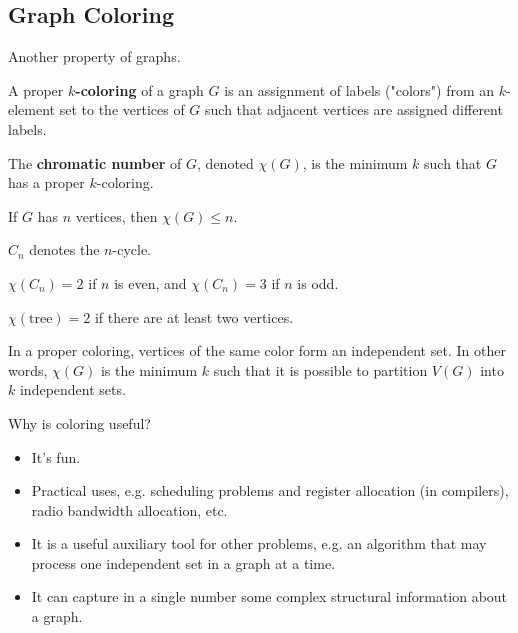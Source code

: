 
\subsection{Graph Coloring}

Another property of graphs.

\begin{definition}
	A proper \( k \)\textbf{-coloring} of a graph \( G \) is an assignment of labels ("colors") from an \( k \)-element set to the vertices of \( G \) such that adjacent vertices are assigned different labels.
\end{definition}

\begin{definition}
	The \textbf{chromatic number} of \( G \), denoted \( \chi(G) \), is the minimum \( k \) such that \( G \) has a proper \( k \)-coloring.
\end{definition}

\begin{note}
	If \( G \) has \( n \) vertices, then \( \chi(G) \le n \).
\end{note}

\begin{notation}
	\( C_n \) denotes the \( n \)-cycle.
\end{notation}

\begin{eg}
	\( \chi(C_n) = 2\) if \( n \) is even, and \( \chi(C_n) = 3 \) if \( n \) is odd.
\end{eg}

\begin{eg}
	\( \chi(\text{tree}) = 2 \) if there are at least two vertices.
\end{eg}

\begin{note}
	In a proper coloring, vertices of the same color form an independent set. In other words, \( \chi(G) \) is the minimum \( k \) such that it is possible to partition \( V(G) \) into \( k \) independent sets.
\end{note}

Why is coloring useful?
\begin{itemize}
	\item It's fun. 
	\item Practical uses, e.g. scheduling problems and register allocation (in compilers), radio bandwidth allocation, etc.
	\item It is a useful auxiliary tool for other problems, e.g. an algorithm that may process one independent set in a graph at a time.
	\item It can capture in a single number some complex structural information about a graph.
\end{itemize}

